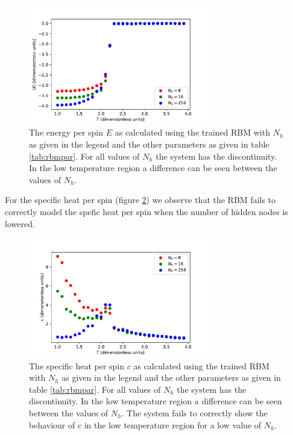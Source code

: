\documentclass[10 pt, a4paper]{article}
\begin{document}
\begin{figure}[H] 
\centering
\includegraphics[width=0.7\textwidth]{eRBMmulti}
\caption{The energy per spin $E$ as calculated using the trained RBM with $N_h$ as given in the legend and the other parameters as given in table \ref{tab:rbmpar}. For all values of $N_h$ the system has the discontinuity. In the low temperature region a difference can be seen between the values of $N_h$. }
\label{fig:eRBMmul}
\end{figure}

\newpage

For the specific heat per spin (figure \ref{fig:cRBMmul}) we observe that the RBM fails to correctly model the spefic heat per spin when the number of hidden nodes is lowered.

\begin{figure}[H] 
\centering
\includegraphics[width=0.7\textwidth]{cRBMmulti}
\caption{The specific heat per spin $c$ as calculated using the trained RBM with $N_h$ as given in the legend and the other parameters as given in table \ref{tab:rbmpar}. For all values of $N_h$ the system has the discontinuity. In the low temperature region a difference can be seen between the values of $N_h$. The system fails to correctly show the behaviour of $c$ in the low temperature region for a low value of $N_h$. }
\label{fig:cRBMmul}
\end{figure}
\end{document}
